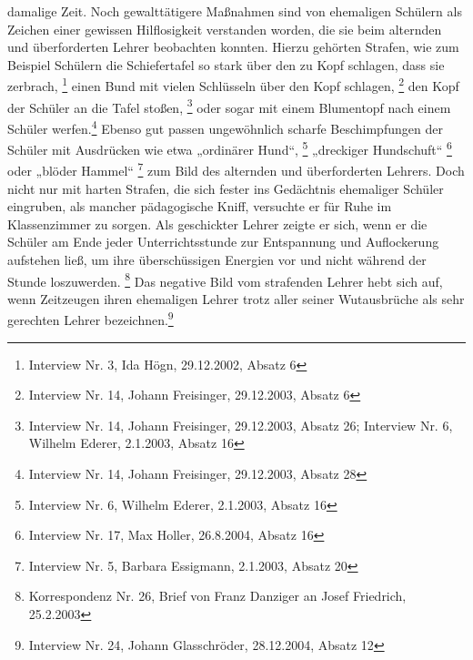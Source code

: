damalige Zeit. Noch gewalttätigere Maßnahmen sind von ehemaligen
Schülern als Zeichen einer gewissen Hilflosigkeit verstanden worden,
die sie beim alternden und überforderten Lehrer beobachten konnten.
Hierzu gehörten Strafen, wie zum Beispiel Schülern die Schiefertafel so
stark über den zu Kopf schlagen, dass sie zerbrach, \footnote{Interview
Nr. 3, Ida Högn, 29.12.2002, Absatz 6} einen Bund mit vielen Schlüsseln
über den Kopf schlagen, \footnote{Interview Nr. 14, Johann Freisinger,
29.12.2003, Absatz 6} den Kopf der Schüler an die Tafel
stoßen, \footnote{Interview Nr. 14, Johann Freisinger, 29.12.2003,
Absatz 26; Interview Nr. 6, Wilhelm Ederer, 2.1.2003, Absatz 16} oder
sogar mit einem Blumentopf nach einem Schüler werfen.\footnote{
Interview Nr. 14, Johann Freisinger, 29.12.2003, Absatz 28} Ebenso gut
passen ungewöhnlich scharfe Beschimpfungen der Schüler mit Ausdrücken
wie etwa „ordinärer Hund“, \footnote{Interview Nr. 6, Wilhelm Ederer,
2.1.2003, Absatz 16} „dreckiger Hundschuft“ \footnote{Interview Nr. 17,
Max Holler, 26.8.2004, Absatz 16} oder „blöder Hammel“ \footnote{
Interview Nr. 5, Barbara Essigmann, 2.1.2003, Absatz 20} zum Bild des
alternden und überforderten Lehrers. Doch nicht nur mit harten Strafen,
die sich fester ins Gedächtnis ehemaliger Schüler eingruben, als
mancher pädagogische Kniff, versuchte er für Ruhe im Klassenzimmer zu
sorgen. Als geschickter Lehrer zeigte er sich, wenn er die Schüler am
Ende jeder Unterrichtsstunde zur Entspannung und Auflockerung aufstehen
ließ, um ihre überschüssigen Energien vor und nicht während der Stunde
loszuwerden. \footnote{Korrespondenz Nr. 26, Brief von Franz Danziger
an Josef Friedrich, 25.2.2003} Das negative Bild vom strafenden Lehrer
hebt sich auf, wenn Zeitzeugen ihren ehemaligen Lehrer trotz aller
seiner Wutausbrüche als sehr gerechten Lehrer bezeichnen.\footnote{
Interview Nr. 24, Johann Glasschröder, 28.12.2004, Absatz 12}

